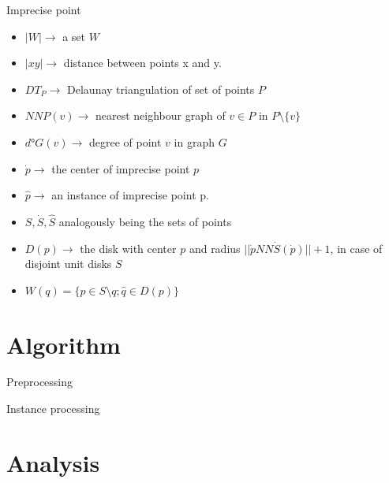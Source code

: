 \documentclass{beamer}
\begin{document}
\begin{frame}{Imprecise point}
\begin{itemize}
\item $|W| \rightarrow $ a set $W$
\item $|xy| \rightarrow $ distance between points x and y.
\item $DT_P \rightarrow $ Delaunay triangulation of set of points $P$
\item $NNP(v) \rightarrow $ nearest neighbour graph of $v \in P$ in $P \setminus \{v\}$
\item $d°G(v) \rightarrow $ degree of point $v$ in graph $G$
\item $\dot{p} \rightarrow $ the center of imprecise point $p$
\item $\hat{p} \rightarrow $ an instance of imprecise point p.
\item $S, \dot{S}, \hat{S} $ analogously being the sets of points 
\item $D(p) \rightarrow $ the disk with center $p$ and radius $||\dot{p} NN\dot{S}(\dot{p})|| + 1$, in case of disjoint unit disks $S$
\item $W(q) = \{p \in S \setminus {q}; \hat{q} \in D(p)\}$ 
\end{itemize}

\end{frame}


\section{Algorithm}
\frame{\tableofcontents[currentsubsection]}
\begin{frame}{Preprocessing}

\end{frame}

\begin{frame}{Instance processing}

\end{frame}


\section{Analysis}
\frame{\tableofcontents[currentsection]}

\begin{frame}

\end{frame}
\end{document}
